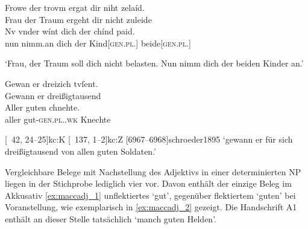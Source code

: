 \begin{exe}
\ex \label{ex:chindpaid}
\begin{xlist}
	\ex \label{ex:chindpaid_1}
		\gll Frowe der trovm ergat dir niht zelaíd. \\
			Frau der Traum ergeht dir nicht zuleide \\
	\sn \gll Nv {vnder wínt} dich der chínd paid. \\
			nun nimm.an dich der Kind[\textsc{gen.pl.\NeutM}]
			beide[\textsc{gen.pl.\NeutM}] \\
		\begin{taggedline}{\parencites%
			[\pno~11\ra, 17]{kc:M}[vgl.]%
			[\pno~6\rb, 22--23]{kc:A1}
			[\pno~8\ra, 12--13]{kc:H}
			[1354]{schroeder1895}
		} %
		\trans `Frau, der Traum soll dich nicht belasten. Nun nimm dich der
			beiden Kinder an.'
		\end{taggedline}

	\ex \label{ex:chindpaid_2}
		\gll Gewan er {dreizich tvſent}. \\
			Gewann er dreißigtausend \\
	\sn \gll Aller guten chnehte. \\
			aller gut-\textsc{gen.pl.\MascM.wk} Knechte \\
		\begin{taggedline}{\parencites%
			[\pno~52\vb, 20--21]{kc:M}[vgl.]%
			[\pno~30\rb, 14--15]{kc:A1}
			[\pno~41\rb, 36--37]{kc:H}
			[\pno~19\vc, 23--24]{kc:B1}
			[\pno~33\vb, 20--21]{kc:VB}
			[\pno~42\ra, 24--25]{kc:K}
			[\pno~137\va, 1--2]{kc:Z}
			[6967--6968]{schroeder1895}
		}
		\trans `gewann er  für sich dreißigtausend
			von allen guten Soldaten.'
		\end{taggedline}
\end{xlist}
\end{exe}

Vergleichbare Belege mit Nachstellung des Adjektivs in einer determinierten NP
liegen in der Stichprobe lediglich vier vor. Davon enthält der einzige Beleg im
Akkusativ \cref{ex:maccadj_1} unflektiertes  `gut', gegenüber
flektiertem  `guten' bei Voranstellung, wie exemplarisch in
\cref{ex:maccadj_2} gezeigt. Die Handschrift A1 enthält an dieser
Stelle %
tatsächlich  `manch guten Helden'.


